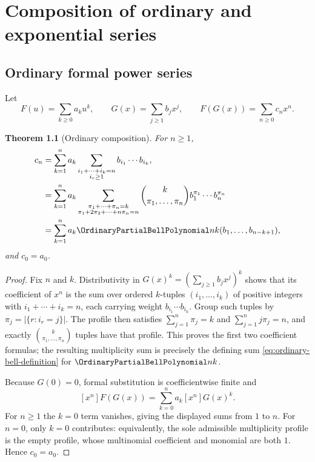 \documentclass[11pt,a4paper,oneside,openany]{book}
\newtheorem{theorem}{Theorem}[chapter]
\theoremstyle{definition}
\theoremstyle{remark}
\begin{document}
\chapter{Composition of ordinary and exponential series}

\section{Ordinary formal power series}
Let
\[
 F(u)=\sum_{k\ge0}a_ku^k,
 \qquad
 G(x)=\sum_{j\ge1}b_jx^j,
 \qquad
 F(G(x))=\sum_{n\ge0}c_nx^n.
\]
\begin{theorem}[Ordinary composition]\label{thm:ordinary-composition}
For $n\ge1$,
\begin{align}
 c_n&=\sum_{k=1}^{n}a_k
 \sum_{\substack{i_1+\cdots+i_k=n\\i_r\ge1}}
 b_{i_1}\cdots b_{i_k},
 \label{eq:ordinary-composition-compositions}\\
 &=\sum_{k=1}^{n}a_k
 \sum_{\substack{\pi_1+\cdots+\pi_n=k\\
                   \pi_1+2\pi_2+\cdots+n\pi_n=n}}
 \binom{k}{\pi_1,\ldots,\pi_n}
 b_1^{\pi_1}\cdots b_n^{\pi_n}
 \label{eq:ordinary-composition-multiplicities}\\
 &=\sum_{k=1}^{n}a_k\OrdinaryPartialBellPolynomial nk(b_1,\ldots,b_{n-k+1}),
 \label{eq:ordinary-composition-bell}
\end{align}
and $c_0=a_0$.
\end{theorem}
\begin{proof}
Fix $n$ and $k$.  Distributivity in
$G(x)^k=(\sum_{j\geq1}b_jx^j)^k$ shows that its coefficient of $x^n$ is the
sum over ordered $k$-tuples $(i_1,\ldots,i_k)$ of positive integers with
$i_1+\cdots+i_k=n$, each carrying weight $b_{i_1}\cdots b_{i_k}$.  Group such
tuples by $\pi_j=|\{r:i_r=j\}|$.  The profile then satisfies
$\sum_{j=1}^{n}\pi_j=k$ and $\sum_{j=1}^{n}j\pi_j=n$, and exactly
$\binom{k}{\pi_1,\ldots,\pi_n}$ tuples have that profile.  This proves the
first two coefficient formulas; the resulting multiplicity sum is precisely
the defining sum \eqref{eq:ordinary-bell-definition} for
$\OrdinaryPartialBellPolynomial nk$.

Because $G(0)=0$, formal substitution is coefficientwise finite and
\[
 [x^n]F(G(x))=\sum_{k=0}^{n}a_k[x^n]G(x)^k.
\]
For $n\geq1$ the $k=0$ term vanishes, giving the displayed sums from $1$ to
$n$.  For $n=0$, only $k=0$ contributes: equivalently, the sole admissible
multiplicity profile is the empty profile, whose multinomial coefficient and
monomial are both $1$.  Hence $c_0=a_0$.
\end{proof}
\end{document}
